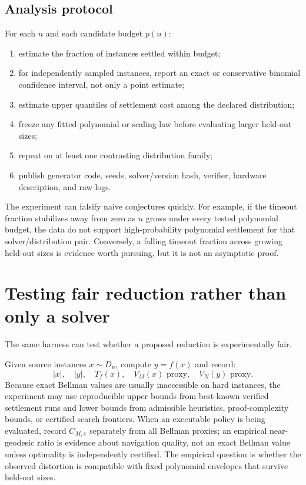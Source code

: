 \documentclass[11pt]{article}
\theoremstyle{definition}
\begin{document}
\subsection*{Analysis protocol}
For each $n$ and each candidate budget $p(n)$:
\begin{enumerate}[label=(\arabic*)]
    \item estimate the fraction of instances settled within budget;
    \item for independently sampled instances, report an exact or conservative binomial confidence interval, not only a point estimate;
    \item estimate upper quantiles of settlement cost among the declared distribution;
    \item freeze any fitted polynomial or scaling law before evaluating larger held-out sizes;
    \item repeat on at least one contrasting distribution family;
    \item publish generator code, seeds, solver/version hash, verifier, hardware description, and raw logs.
\end{enumerate}

The experiment can falsify naive conjectures quickly. For example, if the timeout fraction stabilizes away from zero as $n$ grows under every tested polynomial budget, the data do not support high-probability polynomial settlement for that solver/distribution pair. Conversely, a falling timeout fraction across growing held-out sizes is evidence worth pursuing, but it is not an asymptotic proof.

\section{Testing fair reduction rather than only a solver}
The same harness can test whether a proposed reduction is experimentally fair.

Given source instances $x\sim D_n$, compute $y=f(x)$ and record:
\[
|x|,\quad |y|,\quad T_f(x),\quad V_M(x)\text{ proxy},\quad V_N(y)\text{ proxy}.
\]
Because exact Bellman values are usually inaccessible on hard instances, the experiment may use reproducible upper bounds from best-known verified settlement runs and lower bounds from admissible heuristics, proof-complexity bounds, or certified search frontiers. When an executable policy is being evaluated, record $C_{M,\pi}$ separately from all Bellman proxies; an empirical near-geodesic ratio is evidence about navigation quality, not an exact Bellman value unless optimality is independently certified. The empirical question is whether the observed distortion is compatible with fixed polynomial envelopes that survive held-out sizes.
\end{document}
